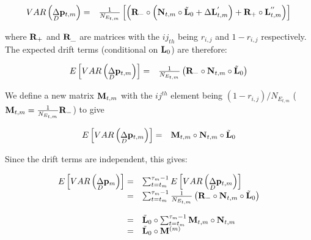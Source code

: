 \documentclass[12pt]{article}
\begin{document}
\begin{bibunit}
\begin{equation}
\begin{array}{rl}
VAR\left(\underset{D}\Delta {\bf p}_{t,m}\right) =& \frac{1}{N_{E_{t,m}}}\left[\left({\bf R}_{-}\circ\left({\bf N}_{t, m}\circ\tilde{\bf L}_{0}+\Delta {\bf L}^{'}_{t, m}\right)+{\bf R}_{+}\circ{\bf L}^{''}_{t, m}\right) \right]\\
\end{array}
\end{equation}

where ${\bf R}_{+}$ and ${\bf R}_{\_}$ are matrices with the $ij_{th}$ being $r_{i,j}$ and $1-r_{i,j}$ respectively. The expected drift terms (conditional on ${\bf L}_0$) are therefore:

\begin{equation}
\begin{array}{rl}
E\left[VAR\left(\underset{D}\Delta {\bf p}_{t,m}\right)\right] =& \frac{1}{N_{E_{t,m}}}\left({\bf R}_{-}\circ{\bf N}_{t,m}\circ\tilde{\bf L}_{0}\right)\\
\end{array}
\end{equation}

We define a new matrix ${\bf M}_{t,m}$ with the $ij^{th}$ element being $(1-r_{i,j})/N_{E_{t,m}}$ (${\bf M}_{t,m}=\frac{1}{N_{E_{t,m}}}{\bf R}_{-}$) to give

\begin{equation}
\begin{array}{rl}
E\left[VAR\left(\underset{D}\Delta {\bf p}_{t,m}\right)\right] 
=& {\bf M}_{t,m}\circ{\bf N}_{t,m}\circ\tilde{\bf L}_{0}\\
\end{array}
\end{equation}


Since the drift terms are independent, this gives:

\begin{equation}
\begin{array}{rl}
E\left[VAR\left(\underset{D}\Delta {\bf p}_{m}\right)\right]=&\sum_{t=t_m}^{\tau_m-1}E\left[VAR\left(\underset{D}\Delta {\bf p}_{t,m}\right)\right]\\
=& \sum_{t=t_m}^{\tau_m-1}\frac{1}{N_{E_{t,m}}}\left({\bf R}_{-}\circ{\bf N}_{t,m}\circ\tilde{\bf L}_{0}\right)\\\\
=& \tilde{\bf L}_{0}\circ\sum_{t=t_m}^{\tau_m-1}{\bf M}_{t,m}\circ{\bf N}_{t,m}\\
=& \tilde{\bf L}_{0}\circ{\bf M}^{(m)}\\
\end{array}
\end{equation}


\end{bibunit}
\end{document}
